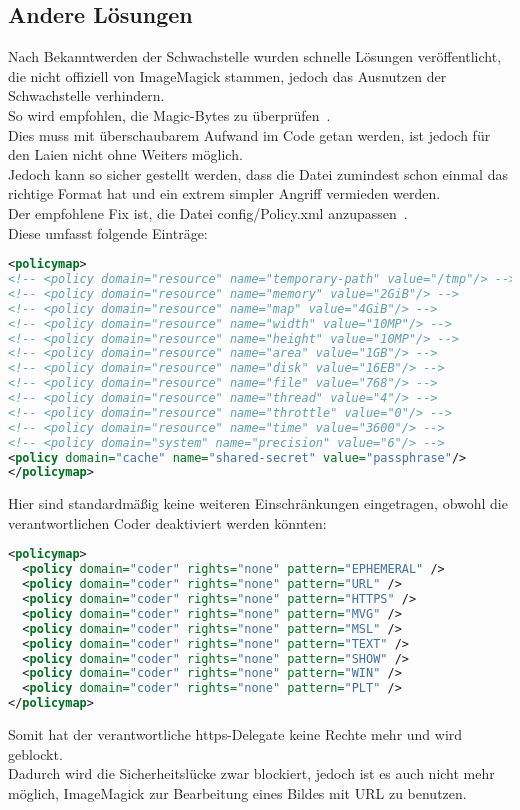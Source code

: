 
\subsection{Andere Lösungen}

Nach Bekanntwerden der Schwachstelle wurden schnelle Lösungen veröffentlicht, die nicht offiziell von ImageMagick stammen, jedoch das Ausnutzen der Schwachstelle verhindern.\\

So wird empfohlen, die Magic-Bytes zu überprüfen~\cite{ImageTragick}.\\
Dies muss mit überschaubarem Aufwand im Code getan werden, ist jedoch für den Laien nicht ohne Weiters möglich.\\
Jedoch kann so sicher gestellt werden, dass die Datei zumindest schon einmal das richtige Format hat und ein extrem simpler Angriff vermieden werden.\\

Der empfohlene Fix ist,  die Datei config/Policy.xml anzupassen~\cite{ImageTragick}.\\
Diese umfasst folgende Einträge:

\begin{lstlisting}[firstnumber=47, language=XML, caption=config/Policy.xml Inhalt,label={lst:lstlisting}]
<policymap>
<!-- <policy domain="resource" name="temporary-path" value="/tmp"/> -->
<!-- <policy domain="resource" name="memory" value="2GiB"/> -->
<!-- <policy domain="resource" name="map" value="4GiB"/> -->
<!-- <policy domain="resource" name="width" value="10MP"/> -->
<!-- <policy domain="resource" name="height" value="10MP"/> -->
<!-- <policy domain="resource" name="area" value="1GB"/> -->
<!-- <policy domain="resource" name="disk" value="16EB"/> -->
<!-- <policy domain="resource" name="file" value="768"/> -->
<!-- <policy domain="resource" name="thread" value="4"/> -->
<!-- <policy domain="resource" name="throttle" value="0"/> -->
<!-- <policy domain="resource" name="time" value="3600"/> -->
<!-- <policy domain="system" name="precision" value="6"/> -->
<policy domain="cache" name="shared-secret" value="passphrase"/>
</policymap>
\end{lstlisting}

Hier sind standardmäßig keine weiteren Einschränkungen eingetragen, obwohl die verantwortlichen Coder deaktiviert werden könnten:

\begin{lstlisting}[language=XML, caption=config/Policy.xml Inhalt,label={lst:lstlisting}]
<policymap>
  <policy domain="coder" rights="none" pattern="EPHEMERAL" />
  <policy domain="coder" rights="none" pattern="URL" />
  <policy domain="coder" rights="none" pattern="HTTPS" />
  <policy domain="coder" rights="none" pattern="MVG" />
  <policy domain="coder" rights="none" pattern="MSL" />
  <policy domain="coder" rights="none" pattern="TEXT" />
  <policy domain="coder" rights="none" pattern="SHOW" />
  <policy domain="coder" rights="none" pattern="WIN" />
  <policy domain="coder" rights="none" pattern="PLT" />
</policymap>
\end{lstlisting}

Somit hat der verantwortliche https-Delegate keine Rechte mehr und wird geblockt.\\
Dadurch wird die Sicherheitslücke zwar blockiert, jedoch ist es auch nicht mehr möglich, ImageMagick zur Bearbeitung eines Bildes mit URL zu benutzen.\\